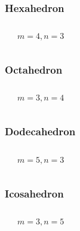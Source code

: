 \documentclass[dvipsnames]{beamer}
\begin{document}
\begin{frame}
  \frametitle{Hexahedron}

  \begin{columns}
    \begin{center}
    \end{center}

    \begin{center}

      $m=4, n=3$
    \end{center}
  \end{columns}
\end{frame}

\begin{frame}
  \frametitle{Octahedron}

  \begin{columns}
    \begin{center}
    \end{center}

    \begin{center}

      $m=3, n=4$
    \end{center}
  \end{columns}
\end{frame}

\begin{frame}
  \frametitle{Dodecahedron}

  \begin{columns}
    \begin{center}
    \end{center}

    \begin{center}

      $m=5, n=3$
    \end{center}
  \end{columns}
\end{frame}

\begin{frame}
  \frametitle{Icosahedron}

  \begin{columns}
    \begin{center}
    \end{center}

    $m=3, n=5$
  \end{columns}
\end{frame}
\end{document}
